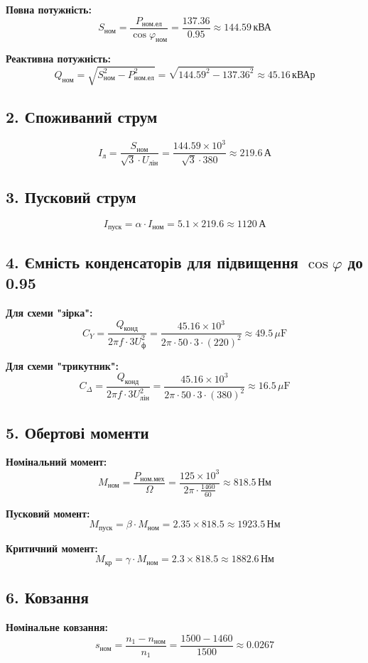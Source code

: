\documentclass[a4paper]{article}
\begin{document}
\textbf{Повна потужність:}
\[
S_{\text{ном}} = \frac{P_{\text{ном.ел}}}{\cos \varphi_{\text{ном}}} = \frac{137.36}{0.95} \approx 144.59 \, \text{кВА}
\]

\textbf{Реактивна потужність:}
\[
Q_{\text{ном}} = \sqrt{S_{\text{ном}}^2 - P_{\text{ном.ел}}^2} = \sqrt{144.59^2 - 137.36^2} \approx 45.16 \, \text{кВАр}
\]

\subsection*{2. Споживаний струм}
\[
I_{л} = \frac{S_{\text{ном}}}{\sqrt{3} \cdot U_{\text{лін}}} = \frac{144.59 \times 10^3}{\sqrt{3} \cdot 380} \approx 219.6 \, \text{А}
\]

\subsection*{3. Пусковий струм}
\[
I_{\text{пуск}} = \alpha \cdot I_{\text{ном}} = 5.1 \times 219.6 \approx 1120 \, \text{А}
\]

\subsection*{4. Ємність конденсаторів для підвищення \( \cos \varphi \) до 0.95}
\textbf{Для схеми "зірка":}
\[
C_Y = \frac{Q_{\text{конд}}}{2 \pi f \cdot 3 U_{ф}^2} = \frac{45.16 \times 10^3}{2 \pi \cdot 50 \cdot 3 \cdot (220)^2} \approx 49.5 \, \mu\text{F}
\]

\textbf{Для схеми "трикутник":}
\[
C_{\Delta} = \frac{Q_{\text{конд}}}{2 \pi f \cdot 3 U_{\text{лін}}^2} = \frac{45.16 \times 10^3}{2 \pi \cdot 50 \cdot 3 \cdot (380)^2} \approx 16.5 \, \mu\text{F}
\]

\subsection*{5. Обертові моменти}
\textbf{Номінальний момент:}
\[
M_{\text{ном}} = \frac{P_{\text{ном.мех}}}{\Omega} = \frac{125 \times 10^3}{2 \pi \cdot \frac{1460}{60}} \approx 818.5 \, \text{Нм}
\]

\textbf{Пусковий момент:}
\[
M_{\text{пуск}} = \beta \cdot M_{\text{ном}} = 2.35 \times 818.5 \approx 1923.5 \, \text{Нм}
\]

\textbf{Критичний момент:}
\[
M_{\text{кр}} = \gamma \cdot M_{\text{ном}} = 2.3 \times 818.5 \approx 1882.6 \, \text{Нм}
\]

\subsection*{6. Ковзання}
\textbf{Номінальне ковзання:}
\[
s_{\text{ном}} = \frac{n_1 - n_{\text{ном}}}{n_1} = \frac{1500 - 1460}{1500} \approx 0.0267
\]
\end{document}
